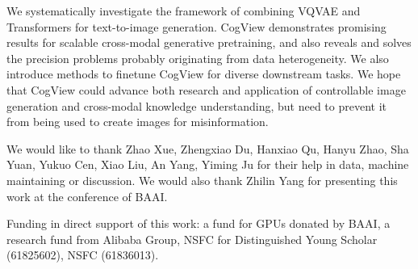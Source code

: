 We systematically investigate the framework of combining VQVAE and Transformers for text-to-image generation. CogView demonstrates promising results for scalable cross-modal generative pretraining, and also reveals and solves the precision problems probably originating from data heterogeneity. We also introduce methods to finetune CogView for diverse downstream tasks. We hope that CogView could advance both research and application of controllable image generation and cross-modal knowledge understanding, but need to prevent it from being used to create images for misinformation.

\acksection
We would like to thank Zhao Xue, Zhengxiao Du, Hanxiao Qu, Hanyu Zhao, Sha Yuan, Yukuo Cen, Xiao Liu, An Yang, Yiming Ju for their help in data, machine maintaining or discussion. We would also thank Zhilin Yang for presenting this work at the conference of BAAI. 

Funding in direct support of this work: a fund for GPUs donated by BAAI, a research fund from Alibaba Group, NSFC for Distinguished Young Scholar (61825602), NSFC (61836013).


